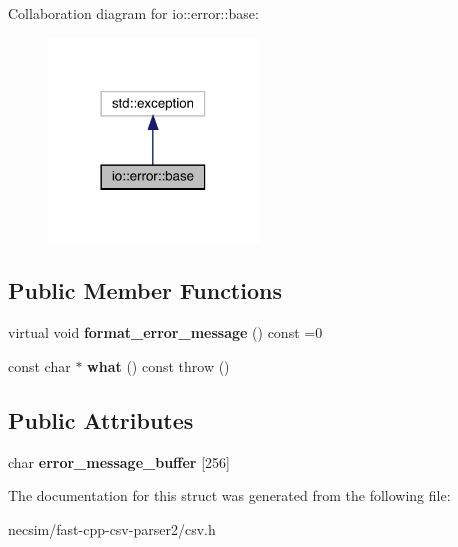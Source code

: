 Collaboration diagram for io\+:\+:error\+:\+:base\+:\nopagebreak
\begin{figure}[H]
\begin{center}
\leavevmode
\includegraphics[width=158pt]{structio_1_1error_1_1base__coll__graph}
\end{center}
\end{figure}
\subsection*{Public Member Functions}
\begin{DoxyCompactItemize}
\item 
virtual void {\bfseries format\+\_\+error\+\_\+message} () const  =0\hypertarget{structio_1_1error_1_1base_aa993f14edd81ef5a6a3bf32381d0d9a3}{}\label{structio_1_1error_1_1base_aa993f14edd81ef5a6a3bf32381d0d9a3}

\item 
const char $\ast$ {\bfseries what} () const   throw ()\hypertarget{structio_1_1error_1_1base_ad99d4a2459e51ce2c24707569c4a0df6}{}\label{structio_1_1error_1_1base_ad99d4a2459e51ce2c24707569c4a0df6}

\end{DoxyCompactItemize}
\subsection*{Public Attributes}
\begin{DoxyCompactItemize}
\item 
char {\bfseries error\+\_\+message\+\_\+buffer} \mbox{[}256\mbox{]}\hypertarget{structio_1_1error_1_1base_a8e38f86a7afea1f0c6e6cac0c548d6f2}{}\label{structio_1_1error_1_1base_a8e38f86a7afea1f0c6e6cac0c548d6f2}

\end{DoxyCompactItemize}


The documentation for this struct was generated from the following file\+:\begin{DoxyCompactItemize}
\item 
necsim/fast-\/cpp-\/csv-\/parser2/csv.\+h\end{DoxyCompactItemize}
